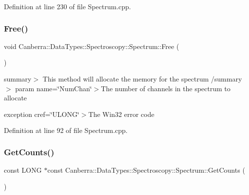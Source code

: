 Definition at line 230 of file Spectrum.\+cpp.

\mbox{\label{class_canberra_1_1_data_types_1_1_spectroscopy_1_1_spectrum_abc604938d84d4da9bdf48425c189c723_abc604938d84d4da9bdf48425c189c723}} 
\subsubsection{\texorpdfstring{Free()}{Free()}}
{\footnotesize\ttfamily void Canberra\+::\+Data\+Types\+::\+Spectroscopy\+::\+Spectrum\+::\+Free (\begin{DoxyParamCaption}{ }\end{DoxyParamCaption})\hspace{0.3cm}{\ttfamily [protected]}}

summary$>$ This method will allocate the memory for the spectrum /summary$>$ param name=\char`\"{}\+Num\+Chan\char`\"{}$>$The number of channels in the spectrum to allocate

exception cref=\char`\"{}\+U\+L\+O\+N\+G\char`\"{}$>$The Win32 error code

Definition at line 92 of file Spectrum.\+cpp.

\mbox{\label{class_canberra_1_1_data_types_1_1_spectroscopy_1_1_spectrum_af6e97b4d0a453ddb0b3b4abe6724443c_af6e97b4d0a453ddb0b3b4abe6724443c}} 
\subsubsection{\texorpdfstring{Get\+Counts()}{GetCounts()}}
{\footnotesize\ttfamily const L\+O\+NG $\ast$const Canberra\+::\+Data\+Types\+::\+Spectroscopy\+::\+Spectrum\+::\+Get\+Counts (\begin{DoxyParamCaption}{ }\end{DoxyParamCaption})}

